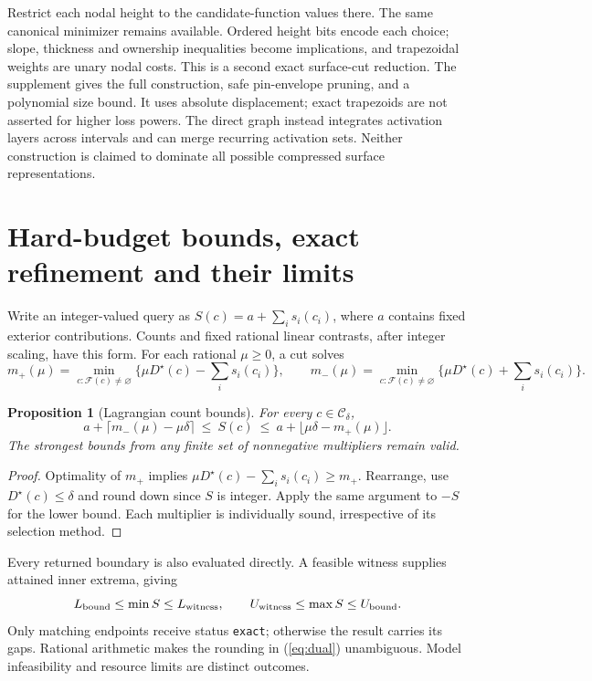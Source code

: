 \documentclass[10pt,letterpaper]{article}
\newtheorem{proposition}[theorem]{Proposition}
\newcommand{\F}{\mathcal F}
\newcommand{\C}{\mathcal C}
\newcommand{\D}{D^\star}
\begin{document}
Restrict each nodal height to the candidate-function values there. The same canonical minimizer remains available. Ordered height bits encode each choice; slope, thickness and ownership inequalities become implications, and trapezoidal weights are unary nodal costs. This is a second exact surface-cut reduction. The supplement gives the full construction, safe pin-envelope pruning, and a polynomial size bound. It uses absolute displacement; exact trapezoids are not asserted for higher loss powers. The direct graph instead integrates activation layers across intervals and can merge recurring activation sets. Neither construction is claimed to dominate all possible compressed surface representations.

\section{Hard-budget bounds, exact refinement and their limits}
Write an integer-valued query as \(S(c)=a+\sum_i s_i(c_i)\), where \(a\) contains fixed exterior contributions. Counts and fixed rational linear contrasts, after integer scaling, have this form. For each rational \(\mu\geq0\), a cut solves
\[
 m_+(\mu)=\min_{c:\F(c)\ne\varnothing}\{\mu\D(c)-\sum_i s_i(c_i)\},\qquad
 m_-(\mu)=\min_{c:\F(c)\ne\varnothing}\{\mu\D(c)+\sum_i s_i(c_i)\}.
\]
\begin{proposition}[Lagrangian count bounds]
For every \(c\in\C_\delta\),
\begin{equation}
 a+\lceil m_-(\mu)-\mu\delta\rceil
 \ \leq\ S(c)\ \leq\
 a+\lfloor\mu\delta-m_+(\mu)\rfloor.\label{eq:dual}
\end{equation}
The strongest bounds from any finite set of nonnegative multipliers remain valid.
\end{proposition}
\begin{proof}
Optimality of \(m_+\) implies \(\mu\D(c)-\sum_i s_i(c_i)\geq m_+\). Rearrange, use \(\D(c)\leq\delta\) and round down since \(S\) is integer. Apply the same argument to \(-S\) for the lower bound. Each multiplier is individually sound, irrespective of its selection method.
\end{proof}
Every returned boundary is also evaluated directly. A feasible witness supplies attained inner extrema, giving
\[
 L_{\rm bound}\leq\min S\leq L_{\rm witness},\qquad
 U_{\rm witness}\leq\max S\leq U_{\rm bound}.
\]
Only matching endpoints receive status \texttt{exact}; otherwise the result carries its gaps. Rational arithmetic makes the rounding in (\ref{eq:dual}) unambiguous. Model infeasibility and resource limits are distinct outcomes.
\end{document}
